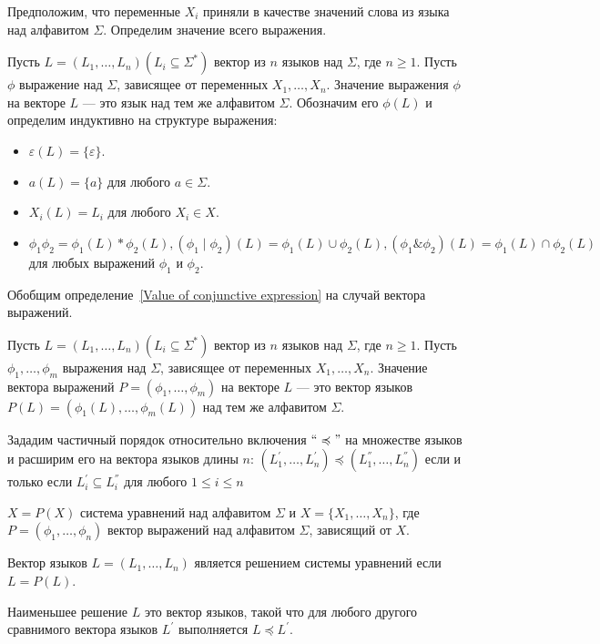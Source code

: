 Предположим, что переменные $X_i$ приняли в качестве значений слова из языка над алфавитом $\Sigma$. Определим значение всего выражения.

\begin{definition}\label{Value of conjunctive expression}
    Пусть $L = (L_1,\ldots,L_n) (L_i \subseteq \Sigma^*)$ вектор из $n$ языков над $\Sigma$, где $n \geqslant 1$. Пусть $\phi$ выражение над $\Sigma$, зависящее от переменных $X_1,\ldots,X_n$. Значение выражения $\phi$ на векторе $L$ --- это язык над тем же алфавитом $\Sigma$. Обозначим его $\phi(L)$ и определим индуктивно на структуре выражения:
    \begin{itemize}
       \item $\varepsilon(L) = \{\varepsilon\}$.
       \item $a(L) = \{a\}$ для любого $a\in\Sigma$.
       \item $X_i(L) = L_i$ для любого $X_i \in X$.
       \item $\phi_1\phi_2 = \phi_1(L) * \phi_2(L), (\phi_1\mid\phi_2)(L) = \phi_1(L) \cup \phi_2(L), (\phi_1\&\phi_2)(L) = \phi_1(L) \cap \phi_2(L)$ для любых выражений $\phi_1$ и $\phi_2$.
    \end{itemize}
\end{definition}

Обобщим определение~\ref{Value of conjunctive expression} на случай вектора выражений.

\begin{definition}
    Пусть $L = (L_1,\ldots,L_n) (L_i \subseteq \Sigma^*)$ вектор из $n$ языков над $\Sigma$, где $n \geqslant 1$. Пусть $\phi_1,\ldots,\phi_m$ выражения над $\Sigma$, зависящее от переменных $X_1,\ldots,X_n$. Значение вектора выражений $P = (\phi_1,\ldots,\phi_m)$ на векторе $L$ --- это вектор языков $P(L) = (\phi_1(L),\ldots,\phi_m(L))$ над тем же алфавитом $\Sigma$. 
\end{definition}

Зададим частичный порядок относительно включения $``\preccurlyeq"$ на множестве языков и расширим его на вектора языков длины $n$: $(L_1^{'},\ldots,L_n^{'})\preccurlyeq(L_1^{''},\ldots,L_n^{''})$ если и только если $L_i^{'} \subseteq L_i^{''}$ для любого $1\leqslant i \leqslant n$

\begin{definition}\label{Definition a conjuctive system of equations}
   $X = P(X)$ система уравнений над алфавитом $\Sigma$ и $X = \{X_1,\ldots,X_n\}$, где $P = (\phi_1,\ldots,\phi_n)$ вектор выражений над алфавитом $\Sigma$, зависящий от $X$.
   
   Вектор языков $L = (L_1,\ldots,L_n)$ является решением системы уравнений если $L = P(L)$.
   
   Наименьшее решение $L$ это вектор языков, такой что для любого другого сравнимого вектора языков $L^{'}$ выполняется $L \preccurlyeq L^{'}$.
\end{definition}

